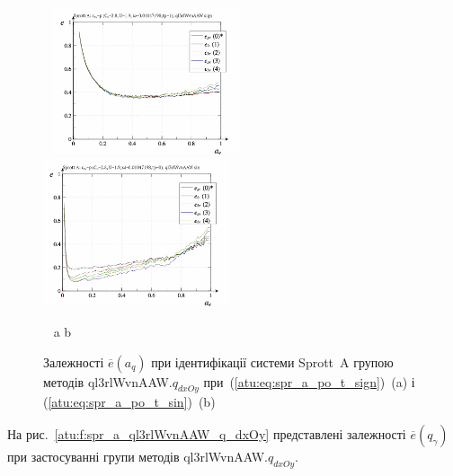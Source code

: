 \begin{figure}[htb!]
\begin{center}
  ~ \hfill
    \includegraphics[width=0.49\textwidth]{p/cha/spr_a/ql3rlWvnAAW_dxOy/sprott_a_id2-p_a_q_sign.png}
    \hfill
    \includegraphics[width=0.49\textwidth]{p/cha/spr_a/ql3rlWvnAAW_dxOy/sprott_a_id2-p_a_q_sin.png}
  \hfill ~
\end{center}
  \vspace{-1.0ex}
  \begin{center}
    ~ \hfill a \hfill\hfill b \hfill ~
  \end{center}
  \caption{Залежності $\overline{e} (a_q)$ при ідентифікації системи Sprott~A групою методів ql3rlWvnAAW.$q_{dxOy}$ при~(\ref{atu:eq:spr_a_po_t_sign})~(a) і (\ref{atu:eq:spr_a_po_t_sin})~(b)}
\label{atu:f:spr_a_a_q_ql3rlWvnAAW_q_dxOy}
\end{figure}

На рис.~\ref{atu:f:spr_a_ql3rlWvnAAW_q_dxOy} представлені залежності
$\overline{e} (q_\gamma)$ при застосуванні групи методів
ql3rlWvnAAW.$q_{dxOy}$.

